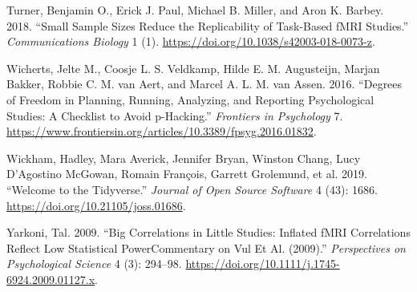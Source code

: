 \documentclass[
  letterpaper,
  DIV=11,
  numbers=noendperiod]{scrartcl}
\newlength{\cslhangindent}
\newenvironment{CSLReferences}[2] %
 {\begin{list}{}{%
  \setlength{\itemindent}{0pt}
  \setlength{\leftmargin}{0pt}
  \setlength{\parsep}{0pt}
  \ifodd #1
   \setlength{\leftmargin}{\cslhangindent}
   \setlength{\itemindent}{-1\cslhangindent}
  \fi
  \setlength{\itemsep}{#2\baselineskip}}}
 {\end{list}}
\begin{document}
\begin{CSLReferences}{1}{0}
Turner, Benjamin O., Erick J. Paul, Michael B. Miller, and Aron K.
Barbey. 2018. {``Small Sample Sizes Reduce the Replicability of
Task-Based fMRI Studies.''} \emph{Communications Biology} 1 (1).
\url{https://doi.org/10.1038/s42003-018-0073-z}.

Wicherts, Jelte M., Coosje L. S. Veldkamp, Hilde E. M. Augusteijn,
Marjan Bakker, Robbie C. M. van Aert, and Marcel A. L. M. van Assen.
2016. {``Degrees of Freedom in Planning, Running, Analyzing, and
Reporting Psychological Studies: A Checklist to Avoid p-Hacking.''}
\emph{Frontiers in Psychology} 7.
\url{https://www.frontiersin.org/articles/10.3389/fpsyg.2016.01832}.

Wickham, Hadley, Mara Averick, Jennifer Bryan, Winston Chang, Lucy
D'Agostino McGowan, Romain François, Garrett Grolemund, et al. 2019.
{``Welcome to the Tidyverse.''} \emph{Journal of Open Source Software} 4
(43): 1686. \url{https://doi.org/10.21105/joss.01686}.

Yarkoni, Tal. 2009. {``Big Correlations in Little Studies: Inflated fMRI
Correlations Reflect Low Statistical Power{\textemdash}Commentary on Vul
Et Al. (2009).''} \emph{Perspectives on Psychological Science} 4 (3):
294--98. \url{https://doi.org/10.1111/j.1745-6924.2009.01127.x}.

\end{CSLReferences}
\end{document}
